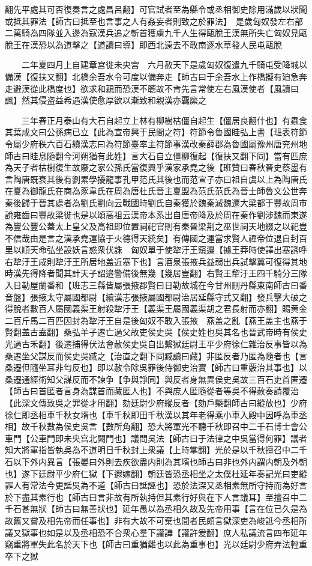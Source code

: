 翻先平處其可否復奏言之處昌呂翻】可官試者至為縣令或丞相御史除用滿歲以狀聞或抵其罪法【師古曰抵至也言事之人有姦妄者則致之於罪法】　是歲匈奴發左右部二萬騎為四隊並入邊為寇漢兵追之斬首獲虜九千人生得甌脫王漢無所失亡匈奴見甌脫王在漢恐以為道擊之【道讀曰導】即西北遠去不敢南逐水草發人民屯甌脫

　　二年夏四月上自建章宫徙未央宫　六月赦天下是歲匈奴復遣九千騎屯受降城以備漢【復扶又翻】北橋余吾水令可度以備奔走【師古曰于余吾水上作橋擬有廹急奔走避漢從此橋度也】欲求和親而恐漢不聼故不肯先言常使左右風漢使者【風讀曰諷】然其侵盗益希遇漢使愈厚欲以漸致和親漢亦覊縻之

　　三年春正月泰山有大石自起立上林有柳樹枯僵自起生【僵居良翻什也】有蟲食其葉成文曰公孫病已立【此為宣帝興于民間之符】符節令魯國眭弘上書【班表符節令屬少府秩六百石續漢志曰為符節臺率主符節事漢改秦薛郡為魯國屬豫州唐兖州地師古曰眭息隨翻今河朔猶有此姓】言大石自立僵柳復起【復扶又翻下同】當有匹庶為天子者枯樹復生故廢之家公孫氏當復興乎漢家承堯之後【班贊曰春秋晉史蔡墨有言陶唐既衰其後有劉累學擾龍事孔甲范氏其後也而范宣子亦曰祖自虞以上為陶唐氏在夏為御龍氏在商為豕韋氏在周為唐杜氏晉主夏盟為范氏范氏為晉士師魯文公世奔秦後歸于晉其處者為劉氏劉向云戰國時劉氏自秦獲於魏秦滅魏遷大梁都于豐故周市說雍齒曰豐故梁徙也是以頌高祖云漢帝本系出自唐帝降及於周在秦作劉涉魏而東遂為豐公豐公蓋太上皇父及高祖即位置祠祀官則有秦晉梁荆之巫世祠天地綴之以祀豈不信哉由是言之漢承堯運協于火德得天統矣】有傳國之運當求賢人禪帝位退自封百里以順天命弘坐設妖言惑衆伏誅　匈奴單于使犂汙王窺邉【據王莽時使譯出塞誘呼右犂汙王咸則犂汙王所居地盖近塞下也】言酒泉張掖兵益弱出兵試擊冀可復得其地時漢先得降者聞其計天子詔邉警備後無幾【幾居豈翻】右賢王犂汙王四千騎分三隊入日勒屋蘭番和【班志三縣皆屬張掖郡賢曰日勒故城在今甘州刪丹縣東南師古曰番音盤】張掖太守屬國都尉【續漢志張掖屬國都尉治居延縣守式又翻】發兵擊大破之得脫者數百人屬國義渠王射殺犂汙王【義渠王屬國義渠胡之君長射而亦翻】賜黄金二百斤馬二百匹因封為犂汙王自是後匈奴不敢入張掖　燕盖之亂【燕王盖主也燕于賢翻盖古盍翻】桑弘羊子遷亡過父故吏侯史吳【侯史姓也吳其名也晉武帝時有侯史光過古禾翻】後遷捕得伏法會赦侯史吳自出繫獄廷尉王平少府徐仁雜治反事皆以為桑遷坐父謀反而侯史吳臧之【治直之翻下同臧讀曰藏】非匿反者乃匿為隨者也【言桑遷但隨坐耳非匄反也】即以赦令除吳罪後侍御史治實【師古曰重覈治其事也】以桑遷通經術知父謀反而不諫争【争與諍同】與反者身無異侯史吳故三百石吏首匿遷【師古曰首匿者言身為謀首而藏匿人也】不與庶人匿隨從者等吳不得赦奏請覆治【此深文傳致吳之罪從才用翻】劾廷尉少府縱反者【劾戶槩翻師古曰縱放也】少府徐仁即丞相車千秋女壻也【車千秋即田千秋漢以其年老得乘小車入殿中因呼為車丞相】故千秋數為侯史吳言【數所角翻】恐大將軍光不聽千秋即召中二千石博士會公車門【公車門即未央宫北闕門也】議問吳法【師古曰于法律之中吳當得何罪】議者知大將軍指皆執吳為不道明日千秋封上衆議【上時掌翻】光於是以千秋擅召中二千石以下外内異言【張晏曰外則去疾欲盡内則為其壻也師古曰非也外内謂内朝及外朝也】遂下廷尉平少府仁獄【下遐嫁翻】朝廷皆恐丞相坐之太僕杜延年奏記光曰吏縱罪人有常法今更詆吳為不道【師古曰詆誣也】恐於法深又丞相素無所守持而為好言於下盡其素行也【師古曰言非故有所執持但其素行好與在下人言議耳】至擅召中二千石甚無狀【師古曰無善狀也】延年愚以為丞相久故及先帝用事【言在位已久是為故舊又嘗及相先帝而任事也】非有大故不可棄也間者民頗言獄深吏為峻詆今丞相所議又獄事也如是以及丞相恐不合衆心羣下讙譁【讙許爰翻】庶人私議流言四布延年竊重將軍失此名於天下也【師古曰重猶難也以此為重事也】光以廷尉少府弄法輕重卒下之獄